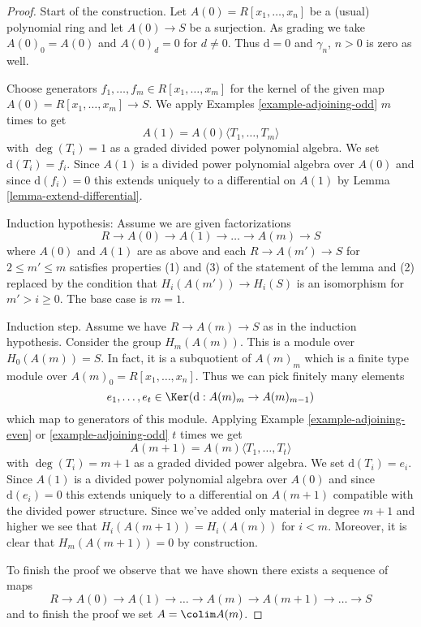 \begin{proof}
Start of the construction. Let $A(0) = R[x_1, \ldots, x_n]$ be
a (usual) polynomial ring and let $A(0) \to S$ be a surjection.
As grading we take $A(0)_0 = A(0)$ and $A(0)_d = 0$ for $d \not = 0$.
Thus $\text{d} = 0$ and $\gamma_n$, $n > 0$ is zero as well.

\medskip\noindent
Choose generators $f_1, \ldots, f_m \in R[x_1, \ldots, x_m]$
for the kernel of the given map $A(0) = R[x_1, \ldots, x_m] \to S$.
We apply Examples \ref{example-adjoining-odd} $m$ times to get
$$
A(1) = A(0)\langle T_1, \ldots, T_m\rangle
$$
with $\deg(T_i) = 1$ as a graded divided power polynomial algebra.
We set $\text{d}(T_i) = f_i$. Since $A(1)$ is a divided power polynomial
algebra over $A(0)$ and since $\text{d}(f_i) = 0$
this extends uniquely to a differential on $A(1)$ by
Lemma \ref{lemma-extend-differential}.

\medskip\noindent
Induction hypothesis: Assume we are given factorizations
$$
R \to A(0) \to A(1) \to \ldots \to A(m) \to S
$$
where $A(0)$ and $A(1)$ are as above and each $R \to A(m') \to S$
for $2 \leq m' \leq m$ satisfies properties (1) and (3)
of the statement of the lemma and (2) replaced by the condition that
$H_i(A(m')) \to H_i(S)$ is an isomorphism for
$m' > i \geq 0$. The base case is $m = 1$.

\medskip\noindent
Induction step. Assume we have $R \to A(m) \to S$
as in the induction hypothesis. Consider the
group $H_m(A(m))$. This is a module over $H_0(A(m)) = S$.
In fact, it is a subquotient of $A(m)_m$ which is a finite
type module over $A(m)_0 = R[x_1, \ldots, x_n]$.
Thus we can pick finitely many elements
$$
e_1, \ldots, e_t \in \Ker(\text{d} : A(m)_m \to A(m)_{m - 1})
$$
which map to generators of this module. Applying
Example \ref{example-adjoining-even} or
\ref{example-adjoining-odd} $t$ times we get
$$
A(m + 1) = A(m)\langle T_1, \ldots, T_t\rangle
$$
with $\deg(T_i) = m + 1$ as a graded divided power algebra. We set
$\text{d}(T_i) = e_i$. Since $A(1)$ is a divided power polynomial
algebra over $A(0)$ and since $\text{d}(e_i) = 0$
this extends uniquely to a differential on $A(m + 1)$
compatible with the divided power structure.
Since we've added only material in degree $m + 1$ and higher we see
that $H_i(A(m + 1)) = H_i(A(m))$ for $i < m$. Moreover, it is
clear that $H_m(A(m + 1)) = 0$ by construction.

\medskip\noindent
To finish the proof we observe that we have shown there exists
a sequence of maps
$$
R \to A(0) \to A(1) \to \ldots \to A(m) \to A(m + 1) \to \ldots \to S
$$
and to finish the proof we set $A = \colim A(m)$.
\end{proof}


